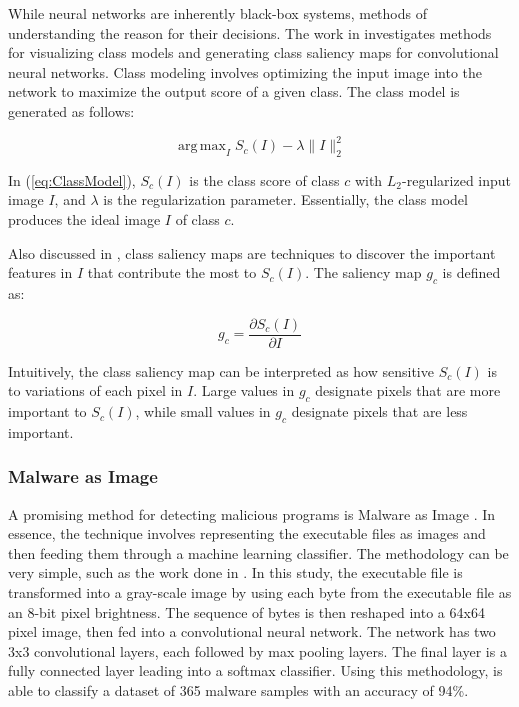 \documentclass[12pt, letterpaper, titlepage]{article}
\newcommand{\eqRef}[1]{(\ref{#1})}
\DeclareMathOperator*{\argmax}{arg\,max}
\begin{document}
While neural networks are inherently black-box systems, methods of understanding the reason for their decisions\cite{Simonyan2013, Selvaraju2017}.
The work in \cite{Simonyan2013} investigates methods for visualizing class models and generating class saliency maps for convolutional neural networks.
Class modeling involves optimizing the input image into the network to maximize the output score of a given class.
The class model is generated as follows:

\begin{equation}
  \argmax_I S_c(I) - \lambda \lVert I \rVert _2^2
  \label{eq:ClassModel}
\end{equation}

In \eqRef{eq:ClassModel}, $S_c(I)$ is the class score of class $c$ with $L_2$-regularized input image $I$, and $\lambda$ is the regularization parameter.
Essentially, the class model produces the ideal image $I$ of class $c$.

Also discussed in \cite{Simonyan2013}, class saliency maps are techniques to discover the important features in $I$ that contribute the most to $S_c(I)$.
The saliency map $g_c$ is defined as:

\begin{equation}
  g_c = \frac{\partial S_c(I)}{\partial I}
  \label{eq:SaliencyMap}
\end{equation}

Intuitively, the class saliency map can be interpreted as how sensitive $S_c(I)$ is to variations of each pixel in $I$.
Large values in $g_c$ designate pixels that are more important to $S_c(I)$, while small values in $g_c$ designate pixels that are less important.

\subsubsection{Malware as Image}
A promising method for detecting malicious programs is Malware as Image \cite{Kancherla, Sgandurra}.
In essence, the technique involves representing the executable files as images and then feeding them through a machine learning classifier.
The methodology can be very simple, such as the work done in \cite{Sgandurra}.
In this study, the executable file is transformed into a gray-scale image by using each byte from the executable file as an 8-bit pixel brightness.
The sequence of bytes is then reshaped into a 64x64 pixel image, then fed into a convolutional neural network.
The network has two 3x3 convolutional layers, each followed by max pooling layers.
The final layer is a fully connected layer leading into a softmax classifier.
Using this methodology, \cite{Sgandurra} is able to classify a dataset of 365 malware samples with an accuracy of 94\%.
\end{document}
